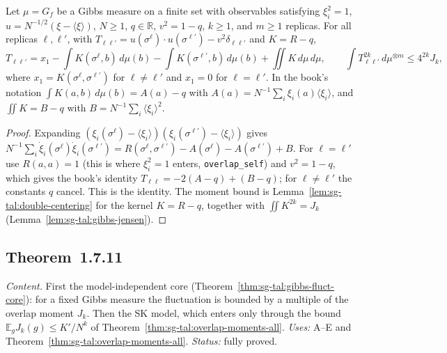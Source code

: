 \begin{theorem}
\label{thm:sg-tal:gram-moments}
  \leanok
{}
Let $\mu=G_f$ be a Gibbs measure on a finite set with observables satisfying $\xi_i^2=1$, $u=N^{-1/2}(\xi-\langle\xi\rangle)$, $N\ge1$, $q\in\mathbb R$, $v^2=1-q$, $k\ge1$, and $m\ge1$ replicas.  For all replicas $\ell,\ell'$, with $T_{\ell\ell'}=u(\sigma^\ell)\cdot u(\sigma^{\ell'})-v^2\delta_{\ell\ell'}$ and $K=R-q$,
\[
T_{\ell\ell'}=x_1-\int K(\sigma^\ell,b)\,d\mu(b)-\int K(\sigma^{\ell'},b)\,d\mu(b)+\iint K\,d\mu\,d\mu,\qquad
\int T_{\ell\ell'}^{2k}\,d\mu^{\otimes m}\le4^{2k}J_k,
\]
where $x_1=K(\sigma^\ell,\sigma^{\ell'})$ for $\ell\ne\ell'$ and $x_1=0$ for $\ell=\ell'$.  In the book's notation $\int K(a,b)\,d\mu(b)=A(a)-q$ with $A(a)=N^{-1}\sum_i\xi_i(a)\langle\xi_i\rangle$, and $\iint K=B-q$ with $B=N^{-1}\sum_i\langle\xi_i\rangle^2$.
\end{theorem}
\begin{proof}
  \leanok
Expanding $(\xi_i(\sigma^\ell)-\langle\xi_i\rangle)(\xi_i(\sigma^{\ell'})-\langle\xi_i\rangle)$ gives $N^{-1}\sum_i\dot\xi_i(\sigma^\ell)\dot\xi_i(\sigma^{\ell'})=R(\sigma^\ell,\sigma^{\ell'})-A(\sigma^\ell)-A(\sigma^{\ell'})+B$.  For $\ell=\ell'$ use $R(a,a)=1$ (this is where $\xi_i^2=1$ enters, \texttt{overlap\_self}) and $v^2=1-q$,
which gives the book's identity $T_{\ell\ell}=-2(A-q)+(B-q)$; for $\ell\ne\ell'$ the constants $q$ cancel.  This is the identity.  The moment bound is Lemma~\ref{lem:sg-tal:double-centering} for the kernel $K=R-q$, together with $\iint K^{2k}=J_k$ (Lemma~\ref{lem:sg-tal:gibbs-jensen}).
\end{proof}

\subsection{Theorem~1.7.11}
\label{sec:sg-tal:fluct-main}

\emph{Content.}  First the model-independent core (Theorem~\ref{thm:sg-tal:gibbs-fluct-core}): for a fixed Gibbs measure the fluctuation is bounded by a multiple of the overlap moment $J_k$.  Then the SK model, which enters only through the bound $\mathbb E_gJ_k(g)\le K'/N^k$ of Theorem~\ref{thm:sg-tal:overlap-moments-all}.  \emph{Uses:} A--E and Theorem~\ref{thm:sg-tal:overlap-moments-all}.
\emph{Status:} fully proved.

